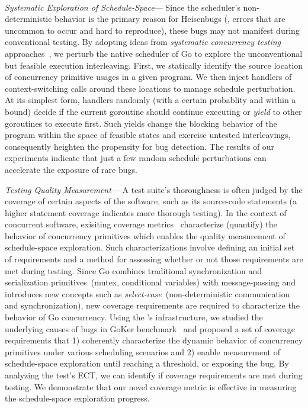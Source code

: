 \\
 \textit{Systematic Exploration of Schedule-Space}---
Since the scheduler's non-deterministic behavior is the primary reason for Heisenbugs (\ie, errors that are uncommon to occur and hard to reproduce), these bugs may not manifest during conventional testing.
%
By adopting ideas from \textit{systematic concurrency testing} approaches~\cite{dpor,thomson-concurrencyTesting-ppopp14,emmi-delayBounded-popl11,burckhardt-depthBug-asplos10,madanlal-preemptionBound-pldi07,yu-maple-oopsla12,joshi-calfuzzer,contest-jgi01,edelstein2003contest,hong-syncTesting-issta12,christakis-erlang-icst13,yuan-morpheus-asplos20}, we perturb the native scheduler of Go to explore the unconventional but feasible execution interleaving.
%
First, we statically identify the source location of concurrency primitive usages in a given program.
%
We then inject handlers of context-switching calls around these locations to manage schedule perturbation.
%
At its simplest form, handlers randomly (with a certain probablity and within a bound) decide if the current goroutine should continue executing or \textit{yield} to other goroutines to execute first.
%
Such yields change the blocking behavior of the program within the space of feasible states and exercise untested interleavings, consequently heighten the propensity for bug detection.
%
The results of our experiments indicate that just a few random schedule perturbations can accelerate the exposure of rare bugs.

 \textit{Testing Quality Measurement}---
A test suite's thoroughness is often judged by the coverage of certain aspects of the software, such as its source-code statements (a higher statement coverage indicates more thorough testing).
%
In the context of concurrent software, exisiting coverage metrics~\cite{edelstein2003contest,trainin-followsCoverage-padtad09,hong-syncTesting-issta12,yu-pset-isca09} characterize (quantify) the behavior of concurrency primitives which enables the quality measurement of schedule-space exploration.
%
Such characterizations involve defining an initial set of requirements and a method for assessing whether or not those requirements are met during testing.
%
Since Go combines traditional synchronization and serialization primitives~(mutex, conditional variables) with message-passing and introduces new concepts such as \textit{select-case}~(non-deterministic communication and synchronization), new coverage requirements are required to characterize the behavior of Go concurrency.
%
Using the \goat's infrastructure, we studied the underlying causes of bugs in GoKer benchmark~\cite{yuan-gobench-cgo21} and proposed a set of coverage requirements that 1) coherently characterize the dynamic behavior of concurrency primitives under various scheduling scenarios and 2) enable measurement of schedule-space exploration until reaching a threshold, or exposing the bug.
%
By analyzing the test's ECT, we can identify if coverage requirements are met during testing.
%
We demonstrate that our novel coverage metric is effective in measuring the schedule-space exploration progress.


